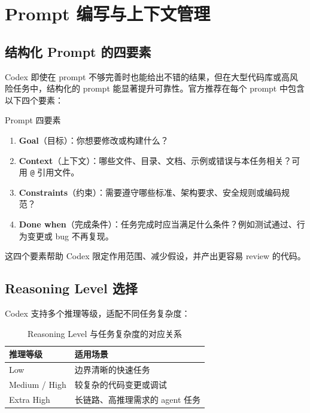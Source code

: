 \section{Prompt 编写与上下文管理}

\subsection{结构化 Prompt 的四要素}

Codex 即使在 prompt 不够完善时也能给出不错的结果，但在大型代码库或高风险任务中，结构化的 prompt 能显著提升可靠性。官方推荐在每个 prompt 中包含以下四个要素：

\begin{importantbox}{Prompt 四要素}
\begin{enumerate}[nosep]
    \item \textbf{Goal}（目标）：你想要修改或构建什么？
    \item \textbf{Context}（上下文）：哪些文件、目录、文档、示例或错误与本任务相关？可用 \texttt{@} 引用文件。
    \item \textbf{Constraints}（约束）：需要遵守哪些标准、架构要求、安全规则或编码规范？
    \item \textbf{Done when}（完成条件）：任务完成时应当满足什么条件？例如测试通过、行为变更或 bug 不再复现。
\end{enumerate}
\end{importantbox}

这四个要素帮助 Codex 限定作用范围、减少假设，并产出更容易 review 的代码。

\subsection{Reasoning Level 选择}

Codex 支持多个推理等级，适配不同任务复杂度：

\begin{table}[H]
\centering
\begin{tabular}{ll}
\toprule
\textbf{推理等级} & \textbf{适用场景} \\
\midrule
Low & 边界清晰的快速任务 \\
Medium / High & 较复杂的代码变更或调试 \\
Extra High & 长链路、高推理需求的 agent 任务 \\
\bottomrule
\end{tabular}
\caption{Reasoning Level 与任务复杂度的对应关系}
\end{table}

